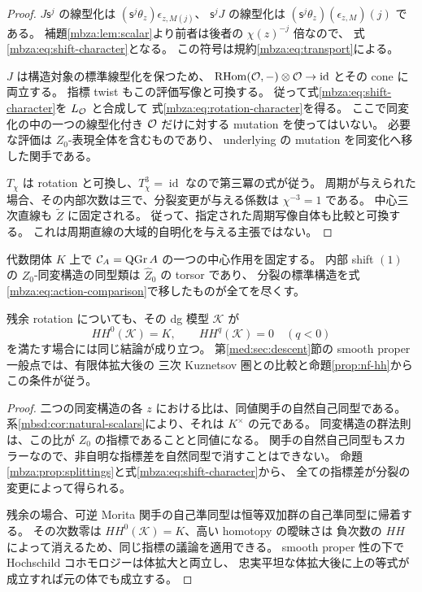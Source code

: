 \begin{proof}
$J\mathsf s^j$ の線型化は
$(\mathsf s^j\theta_z)\epsilon_{z,M(j)}$、
$\mathsf s^jJ$ の線型化は
$(\mathsf s^j\theta_z)(\epsilon_{z,M})(j)$ である。
補題\ref{mbza:lem:scalar}より前者は後者の $\chi(z)^{-j}$ 倍なので、
式\eqref{mbza:eq:shift-character}となる。
この符号は規約\eqref{mbza:eq:transport}による。

$J$ は構造対象の標準線型化を保つため、
$\operatorname{RHom}(\mathcal O,-)\otimes\mathcal O\to\operatorname{id}$ とその cone に両立する。
指標 twist もこの評価写像と可換する。
従って式\eqref{mbza:eq:shift-character}を $L_{\mathcal O}$ と合成して
式\eqref{mbza:eq:rotation-character}を得る。
ここで同変化の中の一つの線型化付き $\mathcal O$ だけに対する mutation を使ってはいない。
必要な評価は $Z_0$-表現全体を含むものであり、
underlying の mutation を同変化へ移した関手である。

$T_\chi$ は rotation と可換し、$T_\chi^3=\operatorname{id}$ なので第三冪の式が従う。
周期が与えられた場合、その内部次数は三で、分裂変更が与える係数は $\chi^{-3}=1$ である。
中心三次直線も $\widetilde Z$ に固定される。
従って、指定された周期写像自体も比較と可換する。
これは周期直線の大域的自明化を与える主張ではない。
\end{proof}

\begin{proposition}[線型化の選択の完全性]
\label{mbza:prop:linearization-torsor}
代数閉体 $K$ 上で $\mathcal C_A=\operatorname{QGr} A$ の一つの中心作用を固定する。
内部 shift $(1)$ の $Z_0$-同変構造の同型類は $\widehat Z_0$ の torsor であり、
分裂の標準構造を式\eqref{mbza:eq:action-comparison}で移したものが全てを尽くす。

残余 rotation についても、その dg 模型 $\mathcal K$ が
\[
 HH^0(\mathcal K)=K,\qquad HH^q(\mathcal K)=0\quad(q<0)
\]
を満たす場合には同じ結論が成り立つ。
第\ref{med:sec:descent}節の smooth proper 一般点では、有限体拡大後の
三次 Kuznetsov 圏との比較と命題\ref{prop:nf-hh}からこの条件が従う。
\end{proposition}
\begin{proof}
二つの同変構造の各 $z$ における比は、同値関手の自然自己同型である。
系\ref{mbsd:cor:natural-scalars}により、それは $K^\times$ の元である。
同変構造の群法則は、この比が $Z_0$ の指標であることと同値になる。
関手の自然自己同型もスカラーなので、非自明な指標差を自然同型で消すことはできない。
命題\ref{mbza:prop:splittings}と式\eqref{mbza:eq:shift-character}から、
全ての指標差が分裂の変更によって得られる。

残余の場合、可逆 Morita 関手の自己準同型は恒等双加群の自己準同型に帰着する。
その次数零は $HH^0(\mathcal K)=K$、高い homotopy の曖昧さは
負次数の $HH$ によって消えるため、同じ指標の議論を適用できる。
smooth proper 性の下で Hochschild コホモロジーは体拡大と両立し、
忠実平坦な体拡大後に上の等式が成立すれば元の体でも成立する。
\end{proof}

